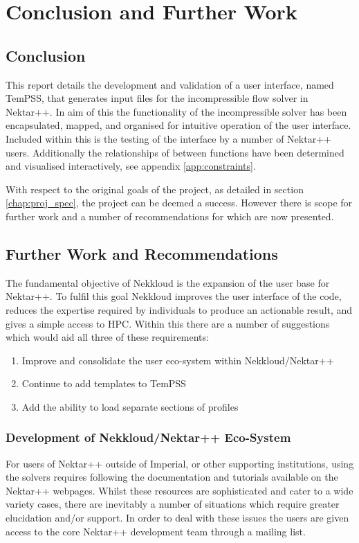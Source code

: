 \documentclass[11pt, a4paper]{report}
\begin{document}
\chapter{Conclusion and Further Work}
\section{Conclusion}
This report details the development and validation of a user interface, named TemPSS, that generates input files for the incompressible flow solver in Nektar++. In aim of this the functionality of the incompressible solver has been encapsulated, mapped, and organised for intuitive operation of the user interface. Included within this is the testing of the interface by a number of Nektar++ users. Additionally the relationships of between functions have been determined and visualised interactively, see appendix \ref{app:constraints}.

With respect to the original goals of the project, as detailed in section \ref{chap:proj_spec}, the project can be deemed a success. However there is scope for further work and a number of recommendations for which are now presented.

\section{Further Work and Recommendations}
The fundamental objective of Nekkloud is the expansion of the user base for Nektar++. To fulfil this goal Nekkloud improves the user interface of the code, reduces the expertise required by individuals to produce an actionable result, and gives a simple access to HPC. Within this there are a number of suggestions which would aid all three of these requirements:

\begin{enumerate}
\item Improve and consolidate the user eco-system within Nekkloud/Nektar++
\item Continue to add templates to TemPSS
\item Add the ability to load separate sections of profiles
\end{enumerate}

\subsection{Development of Nekkloud/Nektar++ Eco-System}
For users of Nektar++ outside of Imperial, or other supporting institutions, using the solvers requires following the documentation and tutorials available on the Nektar++ webpages. Whilst these resources are sophisticated and cater to a wide variety cases, there are inevitably a number of situations which require greater elucidation and/or support. In order to deal with these issues the users are given access to the core Nektar++ development team through a mailing list.
\end{document}
